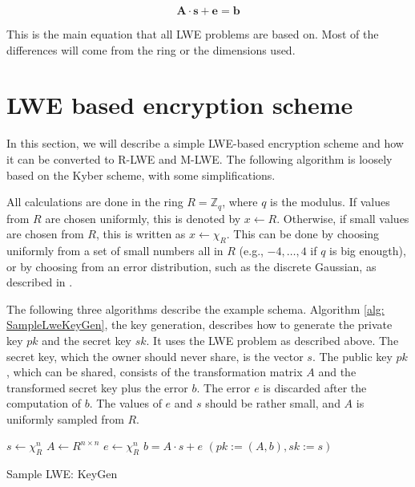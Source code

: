$$\textbf{A}\cdot \textbf{s} + \textbf{e}= \textbf{b}$$

This is the main equation that all LWE problems are based on. Most of the differences will come from the ring or the dimensions used.


\section{LWE based encryption scheme}
\label{sec:Lwe-Encryption}

In this section, we will describe a simple LWE-based encryption scheme and how it can be converted to R-LWE and M-LWE. The following algorithm is loosely based on the Kyber \cite{CyrstalsKyber} scheme, with some simplifications.

All calculations are done in the ring $R = \mathbb{Z}_q$, where $q$ is the modulus. If values from $R$ are chosen uniformly, this is denoted by $x \leftarrow R$. Otherwise, if small values are chosen from $R$, this is written as $x \leftarrow \chi_R$. This can be done by choosing uniformly from a set of small numbers all in $R$ (e.g., ${-4,\ldots, 4}$ if $q$ is big enougth), or by choosing from an error distribution, such as the discrete Gaussian, as described in \cite{Regev2005OnLL}.

The following three algorithms describe the example schema. Algorithm \ref{alg: SampleLweKeyGen}, the key generation, describes how to generate the private key $pk$ and the secret key $sk$. It uses the LWE problem as described above. The secret key, which the owner should never share, is the vector $s$. The public key $pk$, which can be shared, consists of the transformation matrix $A$ and the transformed secret key plus the error $b$. The error $e$ is discarded after the computation of $b$. The values of $e$ and $s$ should be rather small, and $A$ is uniformly sampled from $R$.

\begin{algorithm}[htb]
  \begin{algorithmic}[1]
    \STATE $s \leftarrow \chi_R^n$
    \STATE $A \leftarrow R^{n \times n}$
    \STATE $e \leftarrow \chi_R^n$
    \STATE $b = A\cdot s+e$
    \RETURN $(pk:=(A, b), sk:=s )$
  \end{algorithmic}
  \caption{Sample LWE: KeyGen}
  \label{alg: SampleLweKeyGen}
\end{algorithm}

